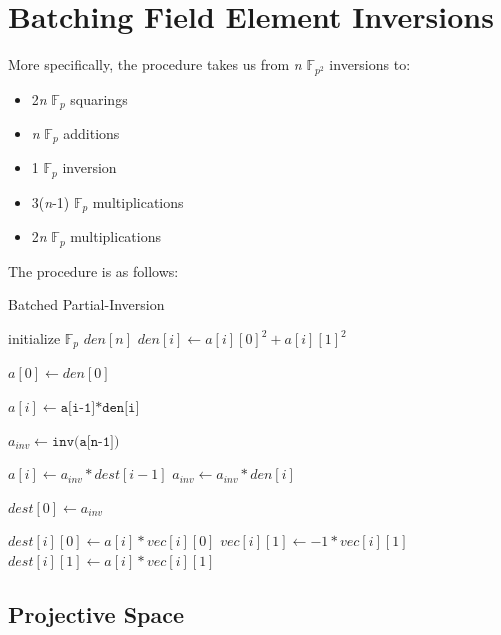 \section{Batching Field Element Inversions}

More specifically, the procedure takes us from \textit{n} $\mathbb{F}_{p^{2}}$  inversions to: 
\begin{center}
\begin{itemize}
\item 2\textit{n} $\mathbb{F}_{p}$ squarings
\item \textit{n} $\mathbb{F}_{p}$ additions
\item 1 $\mathbb{F}_{p}$ inversion
\item 3(\textit{n}-1) $\mathbb{F}_{p}$ multiplications
\item 2\textit{n} $\mathbb{F}_{p}$ multiplications
\end{itemize}
\end{center}

The procedure is as follows:\\

\begin{algorithm}
\caption{Batched Partial-Inversion}\label{euclid}
\begin{algorithmic}[1]
\State initialize $\mathbb{F}_{p}$ $den[n]$
	\State $den[i] \gets a[i][0]^{2} + a[i][1]^{2}$
\EndFor

\State $a[0] \gets den[0]$

	\State $a[i] \gets \texttt{a[i-1]*den[i]}$
\EndFor

\State $a_{inv} \gets \texttt{inv(a[n-1])}$

	\State $a[i] \gets a_{inv}*dest[i-1]$
	\State $a_{inv} \gets a_{inv}*den[i]$
\EndFor

\State $dest[0] \gets a_{inv}$

	\State $dest[i][0] \gets a[i]*vec[i][0]$
	\State $vec[i][1] \gets -1*vec[i][1]$
	\State $dest[i][1] \gets a[i]*vec[i][1]$
\EndFor
\EndProcedure
\end{algorithmic}
\end{algorithm}


\subsection{Projective Space}

